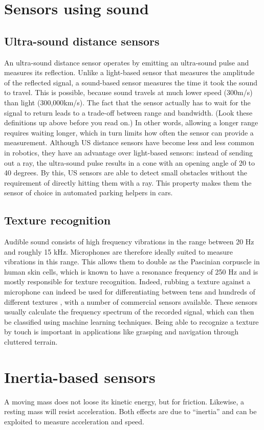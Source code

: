 \section{Sensors using sound}
\subsection{Ultra-sound distance sensors}
An ultra-sound distance sensor operates by emitting an ultra-sound pulse and measures its reflection. Unlike a light-based sensor that measures the amplitude of the reflected signal, a sound-based sensor measures the time it took the sound to travel. This is possible, because sound travels at much lower speed (300m/s) than light (300,000km/s). The fact that the sensor actually has to wait for the signal to return leads to a trade-off between range and bandwidth. (Look these definitions up above before you read on.) In other words, allowing a longer range requires waiting longer, which in turn limits how often the sensor can provide a measurement. Although US distance sensors have become less and less common in robotics, they have an advantage over light-based sensors: instead of sending out a ray, the ultra-sound pulse results in a cone with an opening angle of 20 to 40 degrees. By this, US sensors are able to detect small obstacles without the requirement of directly hitting them with a ray. This property makes them the sensor of choice in automated parking helpers in cars.

\subsection{Texture recognition}
Audible sound consists of high frequency vibrations in the range between 20 Hz and roughly 15 kHz. Microphones are therefore ideally suited to measure vibrations in this range. This allows them to double as the Pascinian corpuscle in human skin cells, which is known to have a resonance frequency of 250 Hz and is mostly responsible for texture recognition. Indeed, rubbing a texture against a microphone can indeed be used for differentiating between tens and hundreds of different textures \cite{hughes14}, with a number of commercial sensors available. These sensors usually calculate the frequency spectrum of the recorded signal, which can then be classified using machine learning techniques. Being able to recognize a texture by touch is important in applications like grasping and navigation through cluttered terrain.

\section{Inertia-based sensors}
A moving mass does not loose its kinetic energy, but for friction. Likewise, a resting mass will resist acceleration. Both effects are due to ``inertia''  and can be exploited to measure acceleration and speed.

